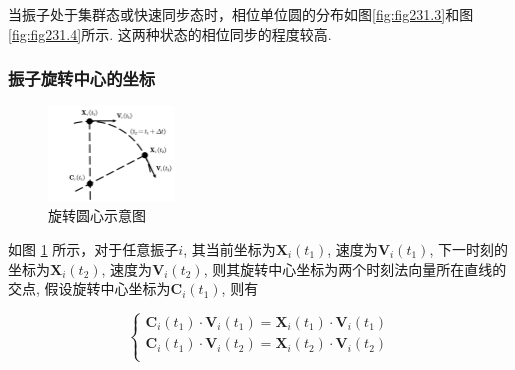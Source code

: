 \documentclass{article}
\begin{document}
当振子处于集群态或快速同步态时，相位单位圆的分布如图\ref{fig:fig231.3}和图\ref{fig:fig231.4}所示. 这两种状态的相位同步的程度较高.

\newpage
\subsubsection{振子旋转中心的坐标}

\begin{figure}[H]
	\centering
	\includegraphics[width=0.3\textwidth]{./figs/CenterEps.pdf}
	\vspace{-0.2cm}
	\caption{旋转圆心示意图}
	\label{fig:fig232.1}
\end{figure}

如图 \ref{fig:fig232.1} 所示，对于任意振子$i$, 其当前坐标为$\mathbf{X}_i\left( t_1 \right)$, 速度为$\mathbf{V}_i\left( t_1 \right)$, 下一时刻的坐标为$\mathbf{X}_i\left( t_2 \right)$, 速度为$\mathbf{V}_i\left( t_2 \right)$, 则其旋转中心坐标为两个时刻法向量所在直线的交点, 假设旋转中心坐标为$\mathbf{C}_i\left( t_1 \right)$, 则有

\vspace{-0.5cm}

$$
\begin{cases}
	\mathbf{C}_i\left( t_1 \right) \cdot \mathbf{V}_i\left( t_1 \right) =\mathbf{X}_i\left( t_1 \right) \cdot \mathbf{V}_i\left( t_1 \right) \\
	\mathbf{C}_i\left( t_1 \right) \cdot \mathbf{V}_i\left( t_2 \right) =\mathbf{X}_i\left( t_2 \right) \cdot \mathbf{V}_i\left( t_2 \right) \\
\end{cases}
$$


\end{document}
